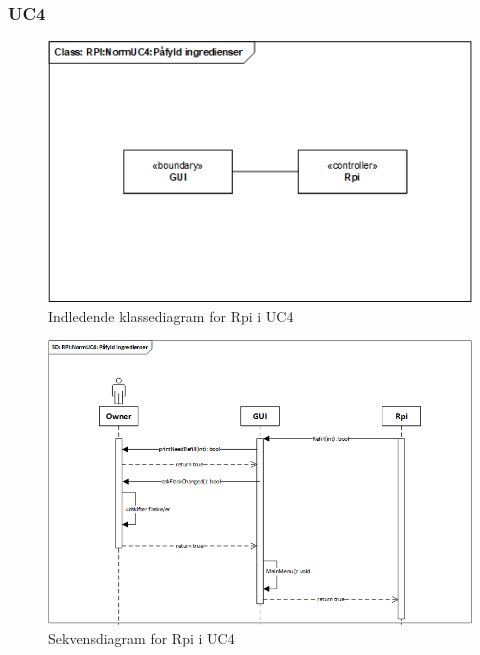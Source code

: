\subsubsection{UC4}

\begin{figure}[H]
    \centering
    \includegraphics[width=1\textwidth]{Images/Applikationsmodeller/rpi/rpi_klassediagramNormUC4.png}
    \caption{Indledende klassediagram for Rpi i UC4}
    \label{fig:cdUC4Rpi}
\end{figure}

\begin{figure}[H]
    \centering
    \includegraphics[width=1\textwidth]{Images/Applikationsmodeller/rpi/rpi_sekvensdiagramNormUC4.png}
    \caption{Sekvensdiagram for Rpi i UC4}
    \label{fig:sdUC4Rpi}
\end{figure}

